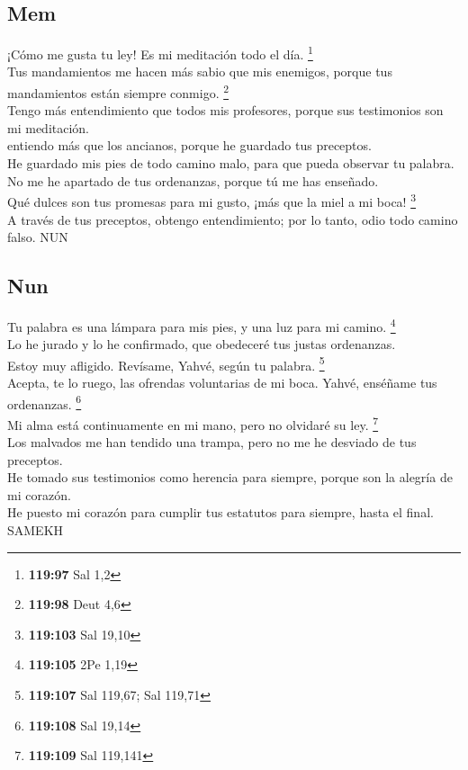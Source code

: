 \hypertarget{mem}{%
\subsection{Mem}\label{mem}}

 ¡Cómo me gusta tu ley! Es mi meditación todo el día.
\footnote{\textbf{119:97} Sal 1,2}\\
 Tus mandamientos me hacen más sabio que mis enemigos,
porque tus mandamientos están siempre conmigo. \footnote{\textbf{119:98}
  Deut 4,6}\\
 Tengo más entendimiento que todos mis profesores, porque
sus testimonios son mi meditación.\\
 entiendo más que los ancianos, porque he guardado tus
preceptos.\\
 He guardado mis pies de todo camino malo, para que
pueda observar tu palabra.\\
 No me he apartado de tus ordenanzas, porque tú me has
enseñado.\\
 Qué dulces son tus promesas para mi gusto, ¡más que la
miel a mi boca! \footnote{\textbf{119:103} Sal 19,10}\\
 A través de tus preceptos, obtengo entendimiento; por
lo tanto, odio todo camino falso. NUN

\hypertarget{nun}{%
\subsection{Nun}\label{nun}}

 Tu palabra es una lámpara para mis pies, y una luz para
mi camino. \footnote{\textbf{119:105} 2Pe 1,19}\\
 Lo he jurado y lo he confirmado, que obedeceré tus
justas ordenanzas.\\
 Estoy muy afligido. Revísame, Yahvé, según tu palabra.
\footnote{\textbf{119:107} Sal 119,67; Sal 119,71}\\
 Acepta, te lo ruego, las ofrendas voluntarias de mi
boca. Yahvé, enséñame tus ordenanzas. \footnote{\textbf{119:108} Sal
  19,14}\\
 Mi alma está continuamente en mi mano, pero no olvidaré
su ley. \footnote{\textbf{119:109} Sal 119,141}\\
 Los malvados me han tendido una trampa, pero no me he
desviado de tus preceptos.\\
 He tomado sus testimonios como herencia para siempre,
porque son la alegría de mi corazón.\\
 He puesto mi corazón para cumplir tus estatutos para
siempre, hasta el final. SAMEKH

